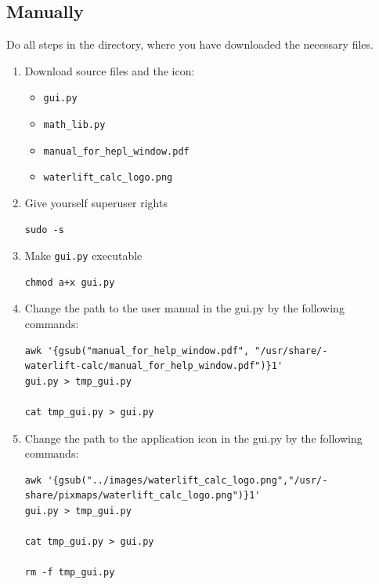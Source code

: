 \documentclass[a5paper, 10pt]{article}
\begin{document}
    \subsection{Manually}
    Do all steps in the directory, where you have downloaded the necessary files.
    \begin{enumerate}
        \item Download source files and the icon:
            \begin{itemize}
                \item \texttt{gui.py}
                \item \texttt{math\_lib.py}
                \item \texttt{manual\_for\_hepl\_window.pdf}
        	    \item \texttt{waterlift\_calc\_logo.png}
            \end{itemize}
        \item Give yourself superuser rights
            \lstset{language=bash, frame=lines}
            \begin{lstlisting}
sudo -s
            \end{lstlisting}
        \item Make \texttt{gui.py} executable
        \lstset{language=bash, frame=lines}
            \begin{lstlisting}
chmod a+x gui.py
            \end{lstlisting}
        \item Change the path to the user manual in the gui.py by the following commands:
            \lstset{language=bash, frame=lines}
            \begin{lstlisting}
awk '{gsub("manual_for_help_window.pdf", "/usr/share/-
waterlift-calc/manual_for_help_window.pdf")}1' 
gui.py > tmp_gui.py

cat tmp_gui.py > gui.py
            \end{lstlisting}
            
        \item Change the path to the application icon in the gui.py by the following commands:
            \lstset{language=bash, frame=lines}
            \begin{lstlisting}
awk '{gsub("../images/waterlift_calc_logo.png","/usr/-
share/pixmaps/waterlift_calc_logo.png")}1' 
gui.py > tmp_gui.py 

cat tmp_gui.py > gui.py 

rm -f tmp_gui.py
            \end{lstlisting}
            

\end{enumerate}
\end{document}
